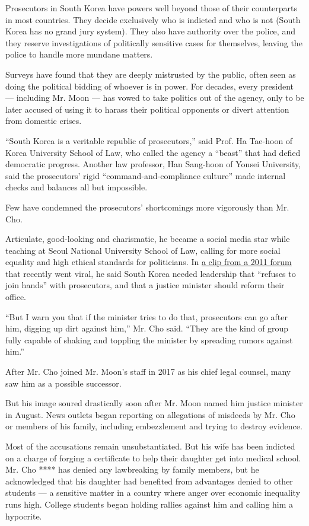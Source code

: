 Prosecutors in South Korea have powers well beyond those of their
counterparts in most countries. They decide exclusively who is indicted
and who is not (South Korea has no grand jury system). They also have
authority over the police, and they reserve investigations of
politically sensitive cases for themselves, leaving the police to handle
more mundane matters.

Surveys have found that they are deeply mistrusted by the public, often
seen as doing the political bidding of whoever is in power. For decades,
every president --- including Mr. Moon --- has vowed to take politics
out of the agency, only to be later accused of using it to harass their
political opponents or divert attention from domestic crises.

``South Korea is a veritable republic of prosecutors,'' said Prof. Ha
Tae-hoon of Korea University School of Law, who called the agency a
``beast'' that had defied democratic progress. Another law professor,
Han Sang-hoon of Yonsei University, said the prosecutors' rigid
``command-and-compliance culture'' made internal checks and balances all
but impossible.

Few have condemned the prosecutors' shortcomings more vigorously than
Mr. Cho.

Articulate, good-looking and charismatic, he became a social media star
while teaching at Seoul National University School of Law, calling for
more social equality and high ethical standards for politicians. In
\href{https://www.youtube.com/watch?v=_kPLYE2ueOg}{a clip from a 2011
forum} that recently went viral, he said South Korea needed leadership
that ``refuses to join hands'' with prosecutors, and that a justice
minister should reform their office.

``But I warn you that if the minister tries to do that, prosecutors can
go after him, digging up dirt against him,'' Mr. Cho said. ``They are
the kind of group fully capable of shaking and toppling the minister by
spreading rumors against him.''

After Mr. Cho joined Mr. Moon's staff in 2017 as his chief legal
counsel, many saw him as a possible successor.

But his image soured drastically soon after Mr. Moon named him justice
minister in August. News outlets began reporting on allegations of
misdeeds by Mr. Cho or members of his family, including embezzlement and
trying to destroy evidence.

Most of the accusations remain unsubstantiated. But his wife has been
indicted on a charge of forging a certificate to help their daughter get
into medical school. Mr. Cho **** has denied any lawbreaking by family
members, but he acknowledged that his daughter had benefited from
advantages denied to other students --- a sensitive matter in a country
where anger over economic inequality runs high. College students began
holding rallies against him and calling him a hypocrite.

